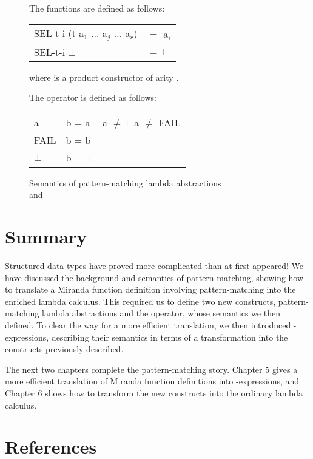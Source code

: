 \begin{figure}[H]
{{\begin{minipage}{\textwidth}
The  functions are defined as follows:
\begin{mlcoded}
\begin{tabular}{ll}
SEL-t-i (t a$_1$ $\ldots$ a$_j$ $\ldots$ a$_r$) &$=$ a$_i$\\
SEL-t-i $\bot$ &$= \bot$
\end{tabular}
\end{mlcoded}
where  is a product constructor of arity .
\vs

The \fatbar{} operator is defined as follows:
\begin{mlcoded}
\begin{tabular}{lll}
a & \fatbar{} b = a \qquad \qquad & \normalfont{if} a $\neq \bot$ \normalfont{and} a $\neq$ FAIL\\
FAIL & \fatbar{} b = b  \\
$\bot$ & \fatbar{} b = $\bot$
\end{tabular}
\end{mlcoded}

            \end{minipage}%
        }%
    }%

    \caption{\textsf Semantics of pattern-matching lambda abstractions \\and \fatbar{}}
\end{figure}

\section{Summary}
Structured data types have proved more complicated than at first appeared! We have discussed the background and semantics of pattern-matching, showing how to translate a Miranda function definition involving pattern-matching into the enriched lambda calculus. This required us to define two new constructs, pattern-matching lambda abstractions and the \fatbar{} operator, whose semantics we then defined. To clear the way for a more efficient translation, we then introduced -expressions, describing their semantics in terms of a transformation into the constructs previously described.

The next two chapters complete the pattern-matching story. Chapter 5 gives a more efficient translation of Miranda function definitions into -expressions, and Chapter 6 shows how to transform the new constructs into the ordinary lambda calculus.


\section*{References}

